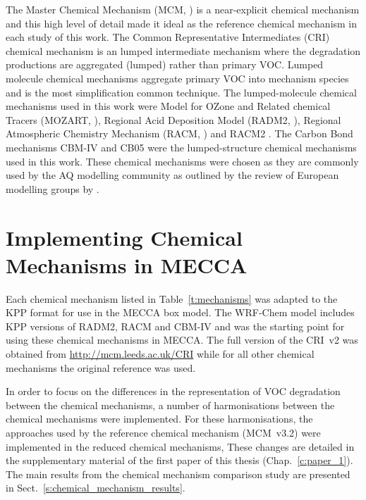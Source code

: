 The Master Chemical Mechanism (MCM, \citet{Jenkin:1997, Jenkin:2003, Saunders:2003, Bloss:2005, MCM_Site}) is a near-explicit chemical mechanism and this high level of detail made it ideal as the reference chemical mechanism in each study of this work.
The Common Representative Intermediates (CRI) chemical mechanism \citep{Jenkin:2008} is an lumped intermediate mechanism where the degradation productions are aggregated (lumped) rather than primary VOC.
Lumped molecule chemical mechanisms aggregate primary VOC into mechanism species and is the most simplification common technique.
The lumped-molecule chemical mechanisms used in this work were Model for OZone and Related chemical Tracers (MOZART, \citet{Emmons:2010}), Regional Acid Deposition Model (RADM2, \citet{Stockwell:1990}), Regional Atmospheric Chemistry Mechanism (RACM, \citet{Stockwell:1997}) and RACM2 \citet{Goliff:2013}.
The Carbon Bond mechanisms CBM-IV \citep{Gery:1989} and CB05 \citep{Yarwood:2005} were the lumped-structure chemical mechanisms used in this work.
These chemical mechanisms were chosen as they are commonly used by the AQ modelling community as outlined by the review of European modelling groups by \citet{Baklanov:2014}.


\section{Implementing Chemical Mechanisms in MECCA} \label{s:mechanisms_MECCA}
Each chemical mechanism listed in Table~\ref{t:mechanisms} was adapted to the KPP format for use in the MECCA box model.
The WRF-Chem model \citep{Grell:2005} includes KPP versions of RADM2, RACM and CBM-IV and was the starting point for using these chemical mechanisms in MECCA.
The full version of the CRI~v2 was obtained from \mbox{\url{http://mcm.leeds.ac.uk/CRI}} while for all other chemical mechanisms the original reference was used.

In order to focus on the differences in the representation of VOC degradation between the chemical mechanisms, a number of harmonisations between the chemical mechanisms were implemented.
For these harmonisations, the approaches used by the reference chemical mechanism (MCM~v3.2) were implemented in the reduced chemical mechanisms,
These changes are detailed in the supplementary material of the first paper of this thesis (Chap.~\ref{c:paper_1}). 
The main results from the chemical mechanism comparison study are presented in Sect.~\ref{s:chemical_mechanism_results}.

